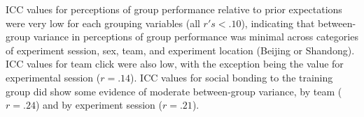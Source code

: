 


ICC values for perceptions of group performance relative to prior expectations were very low for each grouping variables (all $r's < .10$), indicating that between-group variance in perceptions of group performance was minimal across categories of experiment session, sex, team, and experiment location (Beijing or Shandong).  ICC values for team click were also low, with the exception being the value for experimental session ($r = .14$).  ICC values for social bonding to the training group did show some evidence of moderate between-group variance, by team ($r = .24$) and by experiment session ($r = .21$).




